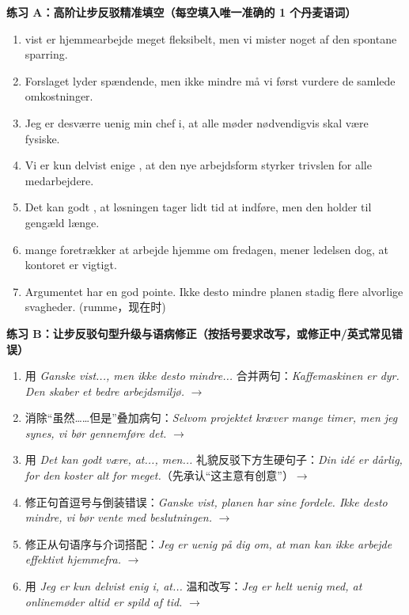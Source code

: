 \textbf{练习 A：高阶让步反驳精准填空（每空填入唯一准确的 1 个丹麦语词）}
\begin{enumerate}
  \item \underline{\hspace{2.2cm}} vist er hjemmearbejde meget fleksibelt, men vi mister noget af den spontane sparring.
  \item Forslaget lyder spændende, men ikke \underline{\hspace{2.2cm}} mindre må vi først vurdere de samlede omkostninger.
  \item Jeg er desværre uenig \underline{\hspace{2.2cm}} min chef i, at alle møder nødvendigvis skal være fysiske.
  \item Vi er kun delvist enige \underline{\hspace{2.2cm}}, at den nye arbejdsform styrker trivslen for alle medarbejdere.
  \item Det kan godt \underline{\hspace{2.2cm}}, at løsningen tager lidt tid at indføre, men den holder til gengæld længe.
  \item \underline{\hspace{2.2cm}} mange foretrækker at arbejde hjemme om fredagen, mener ledelsen dog, at kontoret er vigtigt.
  \item Argumentet har en god pointe. Ikke desto mindre \underline{\hspace{2.2cm}} planen stadig flere alvorlige svagheder. (rumme，现在时)
\end{enumerate}

\textbf{练习 B：让步反驳句型升级与语病修正（按括号要求改写，或修正中/英式常见错误）}
\begin{enumerate}
  \item 用 \textit{Ganske vist..., men ikke desto mindre...} 合并两句：\textit{Kaffemaskinen er dyr. Den skaber et bedre arbejdsmiljø.} $\rightarrow$
  \item 消除“虽然……但是”叠加病句：\textit{Selvom projektet kræver mange timer, men jeg synes, vi bør gennemføre det.} $\rightarrow$
  \item 用 \textit{Det kan godt være, at..., men...} 礼貌反驳下方生硬句子：\textit{Din idé er dårlig, for den koster alt for meget.}（先承认“这主意有创意”）$\rightarrow$
  \item 修正句首逗号与倒装错误：\textit{Ganske vist, planen har sine fordele. Ikke desto mindre, vi bør vente med beslutningen.} $\rightarrow$
  \item 修正从句语序与介词搭配：\textit{Jeg er uenig på dig om, at man kan ikke arbejde effektivt hjemmefra.} $\rightarrow$
  \item 用 \textit{Jeg er kun delvist enig i, at...} 温和改写：\textit{Jeg er helt uenig med, at onlinemøder altid er spild af tid.} $\rightarrow$
\end{enumerate}


